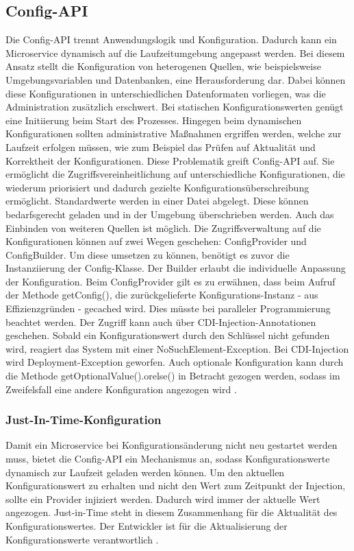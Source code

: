 \subsection{Config-API} 
Die Config-API trennt Anwendungslogik und Konfiguration. Dadurch kann ein Microservice dynamisch auf die Laufzeitumgebung angepasst werden. Bei diesem Ansatz stellt die Konfiguration von heterogenen Quellen, wie beispielsweise Umgebungsvariablen und Datenbanken, eine Herausforderung dar. Dabei können diese Konfigurationen in unterschiedlichen Datenformaten vorliegen, was die Administration zusätzlich erschwert. Bei statischen Konfigurationswerten genügt eine Initiierung beim Start des Prozesses. Hingegen beim dynamischen Konfigurationen sollten administrative Maßnahmen ergriffen werden, welche zur Laufzeit erfolgen müssen, wie zum Beispiel das Prüfen auf Aktualität und Korrektheit der Konfigurationen. 
Diese Problematik greift Config-API auf. Sie ermöglicht die Zugriffsvereinheitlichung auf unterschiedliche Konfigurationen, die wiederum priorisiert und dadurch gezielte Konfigurationsüberschreibung ermöglicht. Standardwerte werden in einer Datei abgelegt. Diese können bedarfsgerecht geladen und in der Umgebung überschrieben werden. Auch das Einbinden von weiteren Quellen ist möglich.
Die Zugriffsverwaltung auf die Konfigurationen können auf zwei Wegen geschehen: ConfigProvider und ConfigBuilder. Um diese umsetzen zu können, benötigt es zuvor die Instanziierung der Config-Klasse. Der Builder erlaubt die individuelle Anpassung der Konfiguration. Beim ConfigProvider gilt es zu erwähnen, dass beim Aufruf der Methode getConfig(), die zurückgelieferte Konfigurations-Instanz - aus Effizienzgründen - gecached wird. Dies müsste bei paralleler Programmierung beachtet werden. Der Zugriff kann auch über CDI-Injection-Annotationen geschehen. Sobald ein Konfigurationswert durch den Schlüssel nicht gefunden wird, reagiert das System mit einer NoSuchElement-Exception. Bei CDI-Injection wird Deployment-Exception geworfen. Auch optionale Konfiguration kann durch die Methode getOptionalValue().orelse() in Betracht gezogen werden, sodass im Zweifelsfall eine andere Konfiguration angezogen wird \cite{LarsRowekamp.2017}. 

\subsubsection{Just-In-Time-Konfiguration} 
Damit ein Microservice bei Konfigurationsänderung nicht neu gestartet werden muss, bietet die Config-API ein Mechanismus an, sodass Konfigurationswerte dynamisch zur Laufzeit geladen werden können. Um den aktuellen Konfigurationswert zu erhalten und nicht den Wert zum Zeitpunkt der Injection, sollte ein Provider injiziert werden. Dadurch wird immer der aktuelle Wert angezogen. Just-in-Time steht in diesem Zusammenhang für die Aktualität des Konfigurationswertes. Der Entwickler ist für die Aktualisierung der Konfigurationswerte verantwortlich \cite{LarsRowekamp.2017}. 

